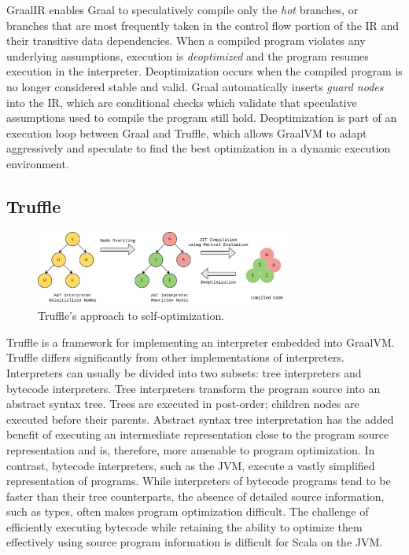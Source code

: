 GraalIR enables Graal to speculatively compile only the \textit{hot} branches\cite{graalvm:speculative-ir}, or branches that are most frequently taken in the control flow portion of the IR and their transitive data dependencies.
When a compiled program violates any underlying assumptions, execution is \textit{deoptimized}\cite{self:deoptimization} and the program resumes execution in the interpreter.
Deoptimization occurs when the compiled program is no longer considered stable and valid.
Graal automatically inserts \textit{guard nodes} into the IR, which are conditional checks which validate that speculative assumptions used to compile the program still hold.
Deoptimization is part of an execution loop between Graal and Truffle, which allows GraalVM to adapt aggressively and speculate to find the best optimization in a dynamic execution environment.

\subsection{Truffle}

\begin{figure}[!htb]
	\centering
	\includegraphics[width=0.75\textwidth]{figures/truffle-loop.png}
	\caption{Truffle's approach to self-optimization\cite{truffle:thesis}.}
	\label{diagram:graal-loop}
\end{figure}

Truffle is a framework for implementing an interpreter embedded into GraalVM.
Truffle differs significantly from other implementations of interpreters.
Interpreters can usually be divided into two subsets: tree interpreters and bytecode interpreters.
Tree interpreters transform the program source into an abstract syntax tree. 
Trees are executed in post-order; children nodes are executed before their parents.
Abstract syntax tree interpretation has the added benefit of executing an intermediate representation close to the program source representation and is, therefore, more amenable to program optimization.
In contrast, bytecode interpreters, such as the JVM, execute a vastly simplified representation of programs.
While interpreters of bytecode programs tend to be faster than their tree counterparts, the absence of detailed source information, such as types, often makes program optimization difficult.
The challenge of efficiently executing bytecode while retaining the ability to optimize them effectively using source program information is difficult for Scala on the JVM. 


